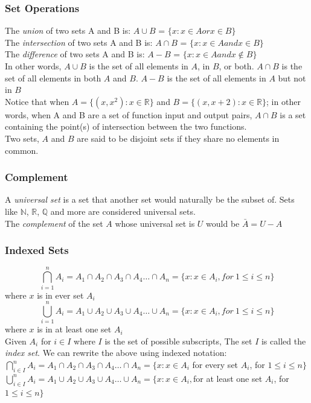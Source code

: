 \documentclass[a4paper,11pt]{article}
\begin{document}
\subsubsection{Set Operations}
The \textit{union} of two sets A and B is: $A \cup B$ = $\{x:x \in A or x \in B\}$\\
The \textit{intersection} of two sets A and B is: $A \cap B$ = $\{x:x \in A and x \in B\}$\\
The \textit{difference} of two sets A and B is: $A - B$ = $\{x:x \in A and x \notin B\}$\vspace{5pt}\\
In other words, $A \cup B$ is the set of all elements in $A$, in $B$, or both. $A \cap B$ is the set of all elements in both $A$ and $B$. $A - B$ is the set of all elements in $A$ but not in $B$\vspace{5pt}\\
Notice that when $A=\{(x, x^{2}):x \in \mathbb{R}\}$ and $B=\{(x, x+2):x \in \mathbb{R}\}$; in other words, when A and B are a set of function input and output pairs, $A \cap B$ is a set containing the point(s) of intersection between the two functions.\bigskip\\
Two sets, $A$ and $B$ are said to be disjoint sets if they share no elements in common.
\subsubsection{Complement}
A \textit{universal set} is a set that another set would naturally be the subset of. Sets like $\mathbb N$, $\mathbb R$, $\mathbb Q$ and more are considered universal sets.\vspace{5pt}\\
The \textit{complement} of the set $A$ whose universal set is $U$ would be $\bar{A}=U-A$
\subsubsection{Indexed Sets}
\[\bigcap_{i=1}^{n}A_{i}=A_1 \cap A_2 \cap A_3 \cap A_4 \dots \cap A_n=\{x:x \in A_i, for~1 \leq i \leq n\}\]
where $x$ is in ever set $A_i$
\[\bigcup_{i=1}^{n}A_{i}=A_1 \cup A_2 \cup A_3 \cup A_4 \dots \cup A_n=\{x:x\in A_i, for~1 \leq i \leq n\}\]
where $x$ is in at least one set $A_i$\vspace{5pt}\\
Given $A_i$ for $i \in I$ where $I$ is the set of possible subscripts, The set $I$ is called the \textit{index set}. We can rewrite the above using indexed notation:\vspace{5pt}\\
$\bigcap_{i \in I}^{n}A_{i}=A_1 \cap A_2 \cap A_3 \cap A_4 \dots \cap A_n=\{x:x \in A_i$ for every set $A_i$, for $1 \leq i \leq n\}$\vspace{8pt}\\
$\bigcup_{i \in I}^{n}A_{i}=A_1 \cup A_2 \cup A_3 \cup A_4 \dots \cup A_n=\{x:x\in A_i,$for at least one set $A_i$, for $1 \leq i \leq n\}$
\end{document}
